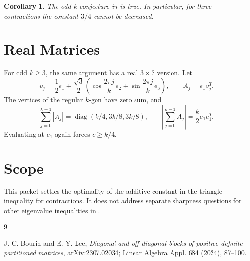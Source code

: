 \documentclass[11pt]{article}
\newtheorem*{corollary}{Corollary}
\newcommand{\diag}{\operatorname{diag}}
\begin{document}
\begin{corollary}
The odd-\(k\) conjecture in \cite{BL} is true. In particular, for three
contractions the constant \(3/4\) cannot be decreased.
\end{corollary}

\section*{Real Matrices}

For odd \(k\geq3\), the same argument has a real \(3\times3\) version.  Let
\[
  v_j=\frac{1}{2}e_1+\frac{\sqrt3}{2}
  \left(\cos \frac{2\pi j}{k}\,e_2+\sin \frac{2\pi j}{k}\,e_3\right),
  \qquad
  A_j=e_1v_j^T.
\]
The vertices of the regular \(k\)-gon have zero sum, and
\[
  \sum_{j=0}^{k-1} |A_j|
  =
  \diag(k/4,3k/8,3k/8),\qquad
  \left|\sum_{j=0}^{k-1}A_j\right|=\frac{k}{2}e_1e_1^T.
\]
Evaluating at \(e_1\) again forces \(c\geq k/4\).

\section*{Scope}

This packet settles the optimality of the additive constant in the triangle
inequality for contractions.  It does not address separate sharpness questions
for other eigenvalue inequalities in \cite{BL}.

\begin{thebibliography}{9}

J.-C. Bourin and E.-Y. Lee,
\emph{Diagonal and off-diagonal blocks of positive definite partitioned matrices},
arXiv:2307.02034; Linear Algebra Appl. 684 (2024), 87--100.

\end{thebibliography}
\end{document}
